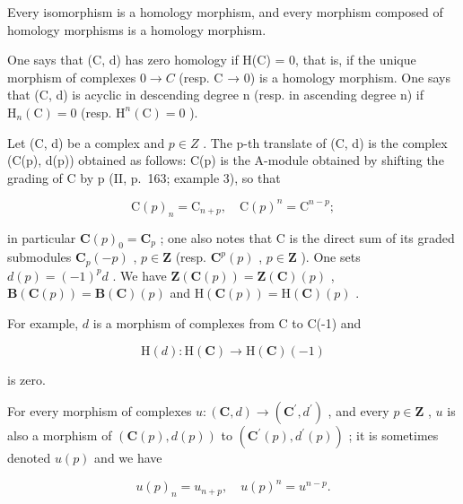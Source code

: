 Every isomorphism is a homology morphism, and every morphism composed of homology morphisms is a homology morphism.

One says that (C, d) has zero homology if H(C) = 0, that is, if the unique morphism of complexes \(0 \rightarrow C\) (resp. C → 0) is a homology morphism. One says that (C, d) is acyclic in descending degree n (resp. in ascending degree n) if \(\mathrm{H}_{n}(\mathrm{C}) = 0\) (resp. \(\mathrm{H}^{n}(\mathrm{C}) = 0\) ).

Let (C, d) be a complex and \(p \in Z\) . The p-th translate of (C, d) is the complex (C(p), d(p)) obtained as follows: C(p) is the A-module obtained by shifting the grading of C by p (II, p.~163; example 3), so that

\[
\mathrm{C} (p) _ {n} = \mathrm{C} _ {n + p}, \quad \mathrm{C} (p) ^ {n} = \mathrm{C} ^ {n - p};
\]

in particular \(\mathbf{C}(p)_{0} = \mathbf{C}_{p}\) ; one also notes that C is the direct sum of its graded submodules \(\mathbf{C}_{p}(-p)\) , \(p \in \mathbf{Z}\) (resp. \(\mathbf{C}^{p}(p)\) , \(p \in \mathbf{Z}\) ). One sets \(d(p) = (-1)^{p} d\) . We have \(\mathbf{Z}(\mathbf{C}(p)) = \mathbf{Z}(\mathbf{C})(p)\) , \(\mathbf{B}(\mathbf{C}(p)) = \mathbf{B}(\mathbf{C})(p)\) and \(\mathrm{H}(\mathbf{C}(p)) = \mathrm{H}(\mathbf{C})(p)\) .

For example, \(d\) is a morphism of complexes from C to C(-1) and

\[
\mathrm{H} (d): \mathrm{H} (\mathbf {C}) \to \mathrm{H} (\mathbf {C}) (- 1)
\]

is zero.

For every morphism of complexes \(u:(\mathbf{C},d)\to(\mathbf{C}^{\prime},d^{\prime})\) , and every \(p\in\mathbf{Z}\) , \(u\) is also a morphism of \((\mathbf{C}(p),d(p))\) to \((\mathbf{C}^{\prime}(p),d^{\prime}(p))\) ; it is sometimes denoted \(u(p)\) and we have

\[
u (p) _ {n} = u _ {n + p}, \quad u (p) ^ {n} = u ^ {n - p}.
\]
